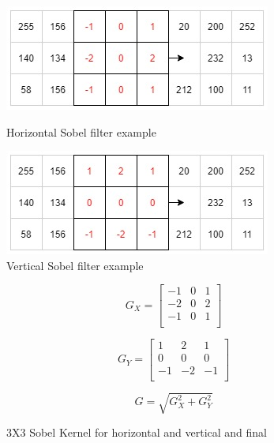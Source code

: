 \documentclass[10pt,twoside]{article}
\begin{document}
\begin{figure}[!htb]
\begin{minipage}{.49\textwidth}
        \includegraphics[scale = 0.55]{GX.jpg}
        \centering
        \caption{Horizontal Sobel filter example}
        \label{fig:InitalDesign}
\end{minipage}
\begin{minipage}{.49\textwidth}
        \includegraphics[scale = 0.55]{GY.jpg}
        \centering
        \caption{Vertical Sobel filter example}
        \label{fig:InitalDesign}
\end{minipage}
\end{figure}



\begin{figure}[hbt]
    \begin{minipage}{.33\textwidth}
    \begin{equation}
    G_{X} =
        \begin{bmatrix}
        -1 & 0 & 1 \\ 
        -2 & 0 & 2 \\
        -1 & 0 & 1 \\
    \end{bmatrix}
    \end{equation}
    \end{minipage}
    \begin{minipage}{.33\textwidth}
    \begin{equation}
         G_{Y} =
        \begin{bmatrix}
        1 & 2 & 1 \\ 
        0 & 0 & 0 \\
        -1 & -2 & -1 \\
    \end{bmatrix}
    \end{equation}
    \end{minipage}
     \begin{minipage}{.33\textwidth}
    \begin{equation}
    G = \sqrt{G_{X}^2 + G_{Y}^2}
    \end{equation}
    \end{minipage}
    \caption{3X3 Sobel Kernel for horizontal and vertical and final}
\end{figure}
\end{document}
